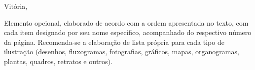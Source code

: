 \documentclass[
	12pt,				%
	openright,			%
	oneside,			%
	a4paper,			%
	english,			%
	french,				%
	spanish,			%
	brazil				%
	]{abntex2}
\begin{document}
%
% 
%
\begin{folhadeaprovacao}

  \begin{center}
    {\ABNTEXchapterfont\large\imprimirautor}

    \vspace*{\fill}\vspace*{\fill}
    \begin{center}
      \ABNTEXchapterfont\bfseries\Large\imprimirtitulo
    \end{center}
    \vspace*{\fill}
    
    \hspace{.45\textwidth}
    \begin{minipage}{.5\textwidth}
        \imprimirpreambulo
    \end{minipage}%
    \vspace*{\fill}
   \end{center}
   
   \begin{flushright}
       

   
   \end{flushright}
      
   \begin{center}
    \vspace*{0.5cm}
    Vitória,
    {\large\imprimirdata}
    \vspace*{1cm}
  \end{center}
  
\end{folhadeaprovacao}


\tableofcontents*
\cleardoublepage


\listoffigures*
Elemento opcional, elaborado de acordo com a ordem apresentada no texto, com
cada item designado por seu nome específico, acompanhado do respectivo número da
página. Recomenda-se a elaboração de lista própria para cada tipo de ilustração (desenhos,
fluxogramas, fotografias, gráficos, mapas, organogramas, plantas, quadros, retratos e
outros).
\cleardoublepage
\end{document}
